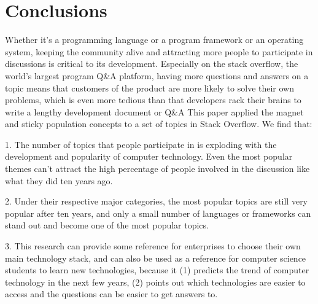 \documentclass[conference]{IEEEtran}
\begin{document}
\section{Conclusions}

Whether it's a programming language or a program framework or an operating system, keeping the community alive and attracting more people to participate in discussions is critical to its development. Especially on the stack overflow, the world's largest program Q\&A platform, having more questions and answers on a topic means that customers of the product are more likely to solve their own problems, which is even more tedious than that developers rack their brains to write a lengthy development document or Q\&A This paper applied the magnet and sticky population concepts to a set of topics in Stack Overflow. We find that:

1. The number of topics that people participate in is exploding with the development and popularity of computer technology. Even the most popular themes can't attract the high percentage of people involved in the discussion like what they did ten years ago.
\smallskip\smallskip

2. Under their respective major categories, the most popular topics are still very popular after ten years, and only a small number of languages or frameworks can stand out and become one of the most popular topics.
\smallskip\smallskip

3. This research can provide some reference for enterprises to choose their own main technology stack, and can also be used as a reference for computer science students to learn new technologies, because it (1) predicts the trend of computer technology in the next few years, (2) points out which technologies are easier to access and the questions can be easier to get answers to.\\


\end{document}

